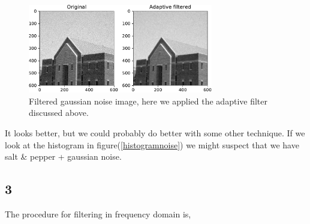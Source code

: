 {\begin{figure}[!htb]
    {\centering
        \includegraphics[width=0.72\textwidth]{gaussianfiltered.pdf}
        \caption{Filtered gaussian noise image, here we applied the adaptive filter discussed above. }
        \label{adaptivefig}
    \par}
    \end{figure}

It looks better, but we could probably do better with some other technique. If we look at the histogram in figure(\ref{histogramnoise}) we might suspect that we have salt \& pepper + gaussian noise.


\subsection{3}

The procedure for filtering in frequency domain is,

}
